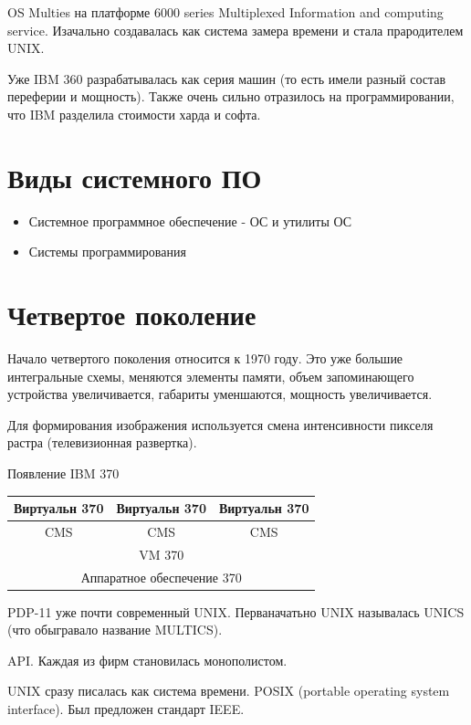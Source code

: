\documentclass[a4paper, 14pt]{report}
\begin{document}
OS Multies на платформе 6000 series Multiplexed Information and computing service. Изачально создавалась как система замера времени и стала прародителем UNIX.

Уже IBM 360 разрабатывалась как серия машин (то есть имели разный состав переферии и мощность). Также очень сильно отразилось на программировании, что IBM разделила стоимости харда и софта.

\section{Виды системного ПО}

\begin{itemize}
    \item Системное программное обеспечение - ОС и утилиты ОС
    \item Системы программирования
\end{itemize}

\section{Четвертое поколение}

Начало четвертого поколения относится к 1970 году. Это уже большие интегральные схемы, меняются элементы памяти, объем запоминающего устройства увеличивается, габариты уменшаются, мощность увеличивается.

Для формирования изображения используется смена интенсивности пикселя растра (телевизионная развертка).

Появление IBM 370

\begin{center}
    \begin{tabular}{|c|c|c|}
        \hline
        Виртуальн 370 & Виртуальн 370 & Виртуальн 370 \\
        \hline
        CMS & CMS & CMS \\
        \hline
        \multicolumn{3}{|c|}{VM 370} \\
        \hline
        \multicolumn{3}{|c|}{Аппаратное обеспечение 370} \\
        \hline
    \end{tabular}
\end{center}

PDP-11 уже почти современный UNIX. Перваначатьно UNIX называлась UNICS (что обыгравало название MULTICS).

API. Каждая из фирм становилась монополистом.

UNIX сразу писалась как система времени. POSIX (portable operating system interface). Был предложен стандарт IEEE.
\end{document}
